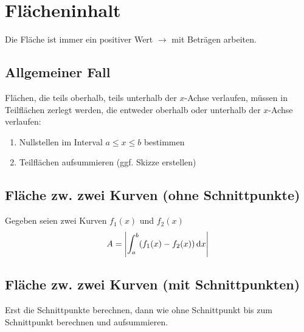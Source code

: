\section{Flächeninhalt}
Die Fläche ist immer ein positiver Wert $\rightarrow$ mit Beträgen arbeiten.

\subsection{Allgemeiner Fall}
Flächen, die teils oberhalb, teils unterhalb der $x$-Achse verlaufen, müssen in Teilflächen zerlegt werden,
die entweder oberhalb oder unterhalb der $x$-Achse verlaufen:
\begin{enumerate}\itemsep0em
	\item Nullstellen im Interval $a \leq x \leq b$ bestimmen
	\item Teilflächen aufsummieren (ggf. Skizze erstellen)
\end{enumerate}

\subsection{Fläche zw. zwei Kurven (ohne Schnittpunkte)}
Gegeben seien zwei Kurven $f_1(x)$ und $f_2(x)$
\begin{equation*}
	A = \left|\int_{a}^{b} (f_1(x) - f_2(x)) \,\mathrm dx\right|
\end{equation*}

\subsection{Fläche zw. zwei Kurven (mit Schnittpunkten)}
Erst die Schnittpunkte berechnen,
dann wie ohne Schnittpunkt bis zum Schnittpunkt berechnen
und aufsummieren.